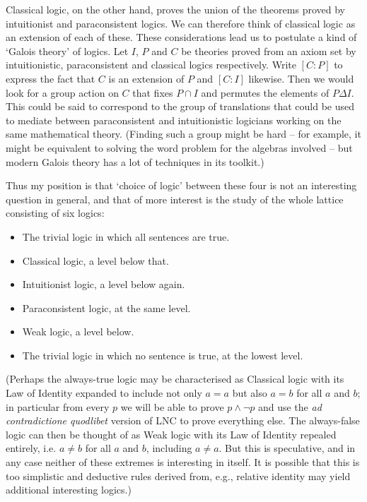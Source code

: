 \documentclass[oneside,english]{article}
\theoremstyle{plain}
\theoremstyle{definition}
\theoremstyle{definition}
\begin{document}
Classical logic, on the other hand, proves the union of the theorems proved by intuitionist and paraconsistent logics. We can therefore think of classical logic as an extension of each of these. These considerations lead us to postulate a kind of `Galois theory' of logics. Let $I$, $P$ and $C$ be theories proved from an axiom set by intuitionistic, paraconsistent and classical logics respectively. Write $[C:P]$ to express the fact that $C$ is an extension of $P$ and $[C:I]$ likewise. Then we would look for a group action on $C$ that fixes $P\cap I$ and permutes the elements of $P\Delta I$. This could be said to correspond to the group of translations that could be used to mediate between paraconsistent and intuitionistic logicians working on the same mathematical theory. (Finding such a group might be hard -- for example, it might be equivalent to solving the word problem for the algebras involved -- but modern Galois theory has a lot of techniques in its toolkit.)

Thus my position is that `choice of logic' between these four is not an interesting question in general, and that of more interest is the study of the whole lattice consisting of six logics:
\begin{itemize}
	\item The trivial logic in which all sentences are true.
	\item Classical logic, a level below that.
	\item Intuitionist logic, a level below again.
	\item Paraconsistent logic, at the same level.
	\item Weak logic, a level below.
	\item The trivial logic in which no sentence is true, at the lowest level.
\end{itemize}

(Perhaps the always-true logic may be characterised as Classical logic with its Law of Identity expanded to include not only $a=a$ but also $a=b$ for all $a$ and $b$; in particular from every $p$ we will be able to prove $p\land\lnot p$ and use the \emph{ad contradictione quodlibet} version of LNC to prove everything else. The always-false logic can then be thought of as Weak logic with its Law of Identity repealed entirely, i.e. $a\ne b$ for all $a$ and $b$, including $a\ne a$. But this is speculative, and in any case neither of these extremes is interesting in itself. It is possible that this is too simplistic and deductive rules derived from, e.g., relative identity may yield additional interesting logics.)
\end{document}
